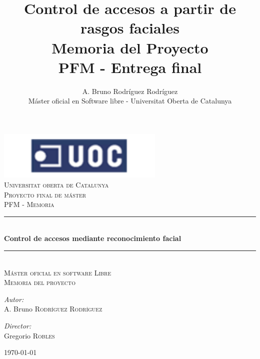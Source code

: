 \documentclass[a4paper]{book}
\newcommand{\HRule}{\rule{\linewidth}{0.5mm}}
\begin{document}
\frontmatter
\title {Control de accesos a partir de rasgos faciales \\ \Large{Memoria del Proyecto} \\ PFM - Entrega final }
\author {A. Bruno Rodríguez Rodríguez \\ \normalsize{Máster oficial en Software libre - Universitat Oberta de Catalunya}}
\date{}

\begin{titlepage}
\begin{center}
	\includegraphics[width=8cm]{uoc.png}\\[1.5cm]
 
	\textsc{\LARGE Universitat oberta de Catalunya}\\[2cm]

	\textsc{\Huge Proyecto final de máster}\\[1cm]
	\textsc{\large PFM - Memoria}\\[1cm]

	\HRule \\[1cm]
	{ \LARGE \bfseries Control de accesos mediante reconocimiento facial}\\[1cm]
	\HRule \\[2cm]

	\textsc{\Large Máster oficial en software Libre}\\[1cm]

	\textsc{\Large Memoria del proyecto}\\[4cm]
 
	\begin{minipage}{0.4\textwidth}
	\begin{flushleft} \large
	\emph{Autor:}\\
	\small{A. Bruno \textsc{Rodríguez Rodríguez}}
	\end{flushleft}
	\end{minipage}
	\begin{minipage}{0.4\textwidth}
	\begin{flushright} \large
	\emph{Director:} \\
	Gregorio \textsc{Robles}
	\end{flushright}
	\end{minipage}

	\vfill
 
	{\large \today}
 
\end{center}
\end{titlepage}
\end{document}
